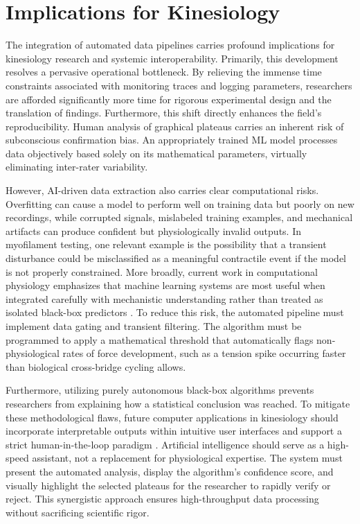 \documentclass[jou]{apa7}
\begin{document}
\section{Implications for Kinesiology}

The integration of automated data pipelines carries profound implications for kinesiology research and systemic interoperability. Primarily, this development resolves a pervasive operational bottleneck. By relieving the immense time constraints associated with monitoring traces and logging parameters, researchers are afforded significantly more time for rigorous experimental design and the translation of findings. Furthermore, this shift directly enhances the field’s reproducibility. Human analysis of graphical plateaus carries an inherent risk of subconscious confirmation bias. An appropriately trained ML model processes data objectively based solely on its mathematical parameters, virtually eliminating inter-rater variability.

However, AI-driven data extraction also carries clear computational risks. Overfitting can cause a model to perform well on training data but poorly on new recordings, while corrupted signals, mislabeled training examples, and mechanical artifacts can produce confident but physiologically invalid outputs. In myofilament testing, one relevant example is the possibility that a transient disturbance could be misclassified as a meaningful contractile event if the model is not properly constrained. More broadly, current work in computational physiology emphasizes that machine learning systems are most useful when integrated carefully with mechanistic understanding rather than treated as isolated black-box predictors \parencite{Lee2025}. To reduce this risk, the automated pipeline must implement data gating and transient filtering. The algorithm must be programmed to apply a mathematical threshold that automatically flags non-physiological rates of force development, such as a tension spike occurring faster than biological cross-bridge cycling allows.

Furthermore, utilizing purely autonomous black-box algorithms prevents researchers from explaining how a statistical conclusion was reached. To mitigate these methodological flaws, future computer applications in kinesiology should incorporate interpretable outputs within intuitive user interfaces and support a strict human-in-the-loop paradigm \parencite{Lee2025}. Artificial intelligence should serve as a high-speed assistant, not a replacement for physiological expertise. The system must present the automated analysis, display the algorithm’s confidence score, and visually highlight the selected plateaus for the researcher to rapidly verify or reject. This synergistic approach ensures high-throughput data processing without sacrificing scientific rigor.
\end{document}
